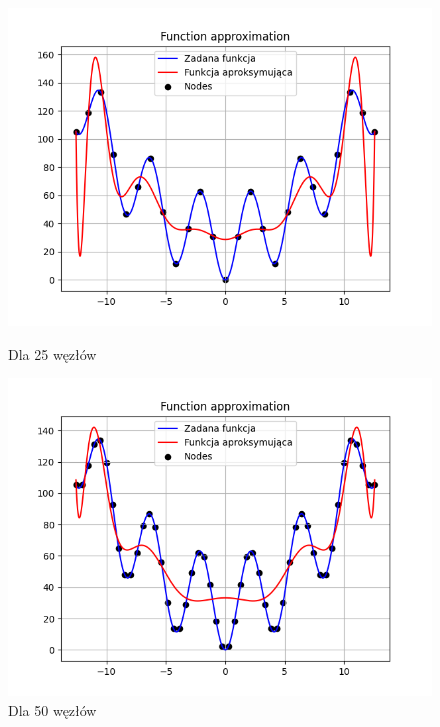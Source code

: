 \documentclass{article}
\begin{document}
\begin{figure}[H]
  \begin{minipage}[b]{0.49\textwidth}
    \begin{minipage}[b]{\textwidth}
      \includegraphics[width=\textwidth]{img41.png}
      \caption{Dla 25 węzłów}
    \end{minipage}
    \vspace*{\fill}
    \begin{minipage}[b]{\textwidth}
      \includegraphics[width=\textwidth]{img42.png}
      \caption{Dla 50 węzłów}
    \end{minipage}
  \end{minipage}
  \hfill
  \begin{minipage}[b]{0.49\textwidth}

\end{minipage}
\end{figure}
\end{document}
